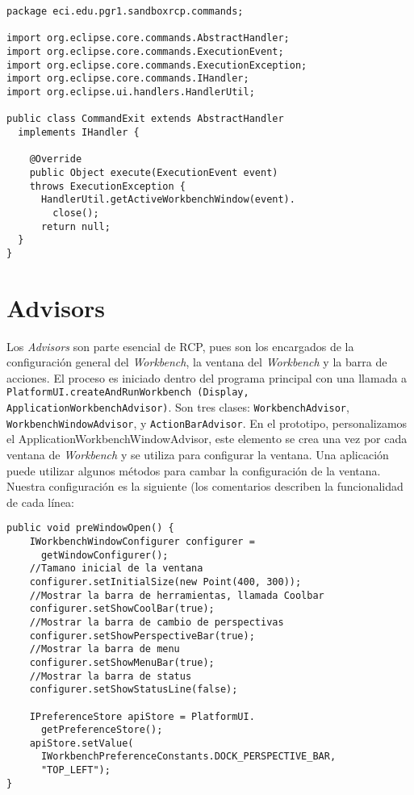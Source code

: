 \documentclass[journal]{IEEEtran}
\begin{document}
\lstset{language=Java, tabsize=4}
\begin{scriptsize}\ttfamily\begin{lstlisting}
package eci.edu.pgr1.sandboxrcp.commands;

import org.eclipse.core.commands.AbstractHandler;
import org.eclipse.core.commands.ExecutionEvent;
import org.eclipse.core.commands.ExecutionException;
import org.eclipse.core.commands.IHandler;
import org.eclipse.ui.handlers.HandlerUtil;

public class CommandExit extends AbstractHandler 
  implements IHandler {

    @Override
    public Object execute(ExecutionEvent event) 
    throws ExecutionException {
	  HandlerUtil.getActiveWorkbenchWindow(event).
	    close();
	  return null;
  }
}
\end{lstlisting}\end{scriptsize}

\section{Advisors}
Los \textit{Advisors} son parte esencial de RCP, pues son los encargados de la configuración general del \textit{Workbench}, la ventana del \textit{Workbench} y la barra de acciones. 
El proceso es iniciado dentro del programa principal con una llamada a \texttt{PlatformUI.createAndRunWorkbench (Display, ApplicationWorkbenchAdvisor)}. Son tres clases: 
\texttt{WorkbenchAdvisor}, \texttt{WorkbenchWindowAdvisor}, y \texttt{ActionBarAdvisor}.\cite{SiVl}
En el prototipo, personalizamos el ApplicationWorkbenchWindowAdvisor, este elemento se crea una vez por cada ventana de \textit{Workbench} y se utiliza para configurar 
la ventana. Una aplicación puede utilizar algunos métodos para cambar la configuración de la ventana. Nuestra configuración es la siguiente (los comentarios describen 
la funcionalidad de cada línea:  

\lstset{language=Java, tabsize=4}
\begin{scriptsize}\ttfamily\begin{lstlisting}
public void preWindowOpen() {
    IWorkbenchWindowConfigurer configurer =
      getWindowConfigurer();
    //Tamano inicial de la ventana
    configurer.setInitialSize(new Point(400, 300));
    //Mostrar la barra de herramientas, llamada Coolbar
    configurer.setShowCoolBar(true);
    //Mostrar la barra de cambio de perspectivas
    configurer.setShowPerspectiveBar(true);
    //Mostrar la barra de menu
    configurer.setShowMenuBar(true);
    //Mostrar la barra de status
    configurer.setShowStatusLine(false);
    
    IPreferenceStore apiStore = PlatformUI.
      getPreferenceStore();
    apiStore.setValue(
      IWorkbenchPreferenceConstants.DOCK_PERSPECTIVE_BAR,
      "TOP_LEFT");
}
\end{lstlisting}\end{scriptsize}
\end{document}
